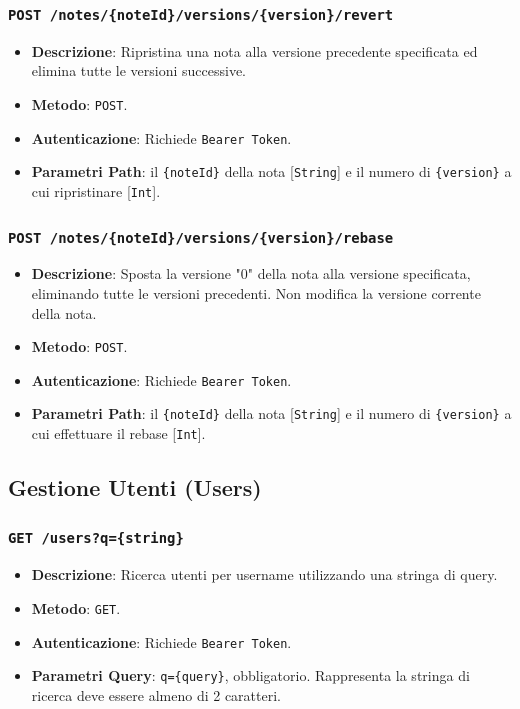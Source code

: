 \documentclass[11pt]{article}
\begin{document}
\subsubsection{\texttt{POST /notes/\{noteId\}/versions/\{version\}/revert}}
\begin{itemize}
    \item \textbf{Descrizione}: Ripristina una nota alla versione precedente specificata ed elimina tutte le versioni successive.
    \item \textbf{Metodo}: \texttt{POST}.
    \item \textbf{Autenticazione}: Richiede \texttt{Bearer Token}.
    \item \textbf{Parametri Path}: il \texttt{\{noteId\}} della nota [\texttt{String}] e il numero di \texttt{\{version\}} a cui ripristinare [\texttt{Int}].
\end{itemize}

\subsubsection{\texttt{POST /notes/\{noteId\}/versions/\{version\}/rebase}}
\begin{itemize}
    \item \textbf{Descrizione}: Sposta la versione "0" della nota alla versione specificata, eliminando tutte le versioni precedenti. Non modifica la versione corrente della nota.
    \item \textbf{Metodo}: \texttt{POST}.
    \item \textbf{Autenticazione}: Richiede \texttt{Bearer Token}.
    \item \textbf{Parametri Path}: il \texttt{\{noteId\}} della nota [\texttt{String}] e il numero di \texttt{\{version\}} a cui effettuare il rebase [\texttt{Int}].
\end{itemize}

\subsection{Gestione Utenti (Users)}

\subsubsection{\texttt{GET /users?q=\{string\}}}
\begin{itemize}
    \item \textbf{Descrizione}: Ricerca utenti per username utilizzando una stringa di query.
    \item \textbf{Metodo}: \texttt{GET}.
    \item \textbf{Autenticazione}: Richiede \texttt{Bearer Token}.
    \item \textbf{Parametri Query}: \texttt{q=\{query\}}, obbligatorio. Rappresenta la stringa di ricerca deve essere almeno di 2 caratteri.
\end{itemize}
\end{document}
